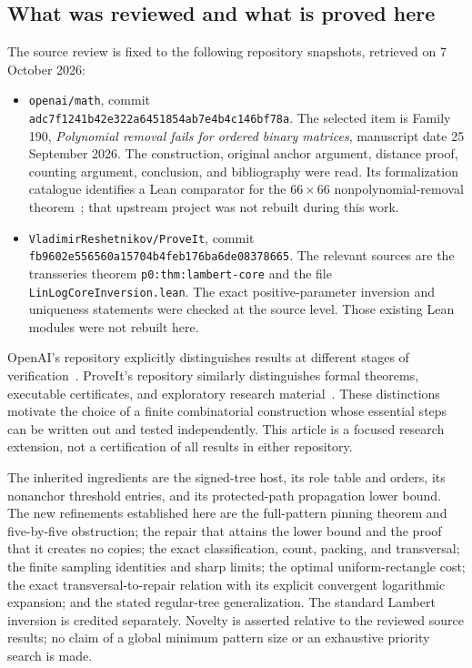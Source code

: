 \subsection{What was reviewed and what is proved here}

The source review is fixed to the following repository snapshots,
retrieved on 7 October 2026:
\begin{itemize}
\item \texttt{openai/math}, commit\\
\texttt{adc7f1241b42e322a6451854ab7e4b4c146bf78a}.
The selected item is Family 190, \emph{Polynomial removal fails for
ordered binary matrices}, manuscript date 25 September 2026.
The construction, original anchor argument, distance proof, counting
argument, conclusion, and bibliography were read. Its formalization
catalogue identifies a Lean comparator for the \(66\times66\)
nonpolynomial-removal theorem~\cite{OAI190Lean}; that upstream project
was not rebuilt during this work.
\item \texttt{VladimirReshetnikov/ProveIt}, commit\\
\texttt{fb9602e556560a15704b4feb176ba6de08378665}.
The relevant sources are the transseries theorem
\texttt{p0:thm:lambert-core} and the file
\texttt{LinLogCoreInversion.lean}. The exact positive-parameter
inversion and uniqueness statements were checked at the source level.
Those existing Lean modules were not rebuilt here.
\end{itemize}

OpenAI's repository explicitly distinguishes results at different
stages of verification~\cite{OAIRepo}. ProveIt's repository similarly
distinguishes formal theorems, executable certificates, and exploratory
research material~\cite{ProveIt}. These distinctions motivate the
choice of a finite combinatorial construction whose essential steps
can be written out and tested independently. This article is a focused
research extension, not a certification of all results in either
repository.

The inherited ingredients are the signed-tree host, its role table and
orders, its nonanchor threshold entries, and its protected-path
propagation lower bound. The new refinements established here are the
full-pattern pinning theorem and five-by-five obstruction; the repair
that attains the lower bound and the proof that it creates no copies;
the exact classification, count, packing, and transversal; the finite
sampling identities and sharp limits; the optimal uniform-rectangle
cost; the exact transversal-to-repair relation with its explicit
convergent logarithmic expansion; and the stated regular-tree
generalization. The standard Lambert inversion is credited separately.
Novelty is asserted relative to the reviewed source results; no claim
of a global minimum pattern size or an exhaustive priority search is
made.

